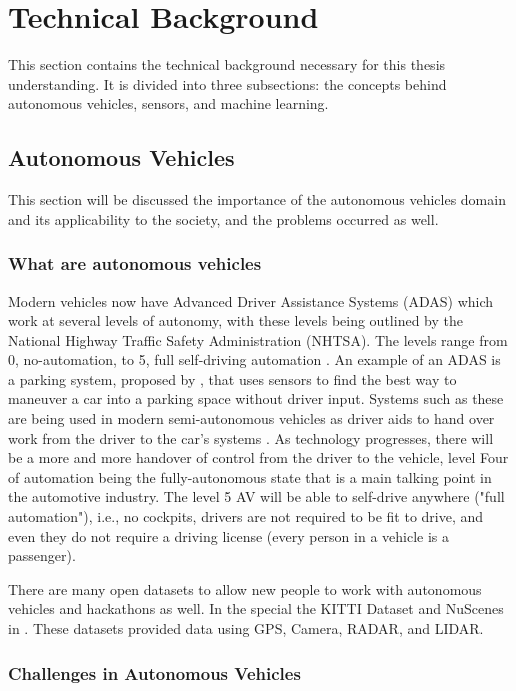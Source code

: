 \section{Technical Background}
This section contains the technical background necessary for this thesis understanding. It is divided into three subsections: the concepts behind autonomous vehicles, sensors, and machine learning.

\subsection{Autonomous Vehicles} \label{autonomous-vehicles}

This section will be discussed the importance of the autonomous vehicles domain and its applicability to the society, and the problems occurred as well. 

\subsubsection{What are autonomous vehicles}
Modern vehicles now have Advanced Driver Assistance Systems (ADAS)
which work at several levels of autonomy, with these levels being
outlined by the National Highway Traffic Safety Administration
(NHTSA). The levels range from 0, no-automation, to 5, full self-driving automation \cite{national2013preliminary}. An example of an ADAS is a parking system, proposed by \cite{krasner2016automatic}, that uses sensors to find the best way to maneuver a car into a parking space without driver input. Systems such as these are being used in modern semi-autonomous
vehicles as driver aids to hand over work from the driver to the
car’s systems \cite{schoning2006parklenkassistent}. As technology progresses, there will be a more
and more handover of control from the driver to the vehicle, level
Four of automation being the fully-autonomous state that is a main talking point in the automotive industry. The level 5 AV will
be able to self-drive anywhere ("full automation"), i.e., no cockpits,
drivers are not required to be fit to drive, and even they do not require a driving license (every person in a vehicle is a passenger).

There are many open datasets to allow new people to work with autonomous vehicles and hackathons as well. In the special the KITTI Dataset \cite{geiger2013vision} and NuScenes in \cite{caesar2020nuscenes}. These datasets provided data using GPS, Camera, RADAR, and LIDAR. 

\subsubsection{Challenges in Autonomous Vehicles}

